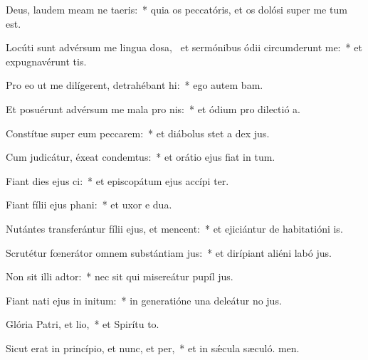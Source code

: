 \item Deus, laudem meam ne taeris:~* quia os peccatóris, et os dolósi super me tum est.
\item Locúti sunt advérsum me lingua dosa,~\pscross{} et sermónibus ódii circumderunt me:~* et expugnavérunt  tis.
\item Pro eo ut me dilígerent, detrahébant hi:~* ego autem bam.
\item Et posuérunt advérsum me mala pro nis:~* et ódium pro dilectió a.
\item Constítue super eum peccarem:~* et diábolus stet a dex jus.
\item Cum judicátur, éxeat condemtus:~* et orátio ejus fiat in tum.
\item Fiant dies ejus ci:~* et episcopátum ejus accípi ter.
\item Fiant fílii ejus phani:~* et uxor e dua.
\item Nutántes transferántur fílii ejus, et mencent:~* et ejiciántur de habitatióni is.
\item Scrutétur fœnerátor omnem substántiam jus:~* et dirípiant aliéni labó jus.
\item Non sit illi adtor:~* nec sit qui misereátur pupíl jus.
\item Fiant nati ejus in initum:~* in generatióne una deleátur no jus.
\item Glória Patri, et lio,~* et Spirítu to.
\item Sicut erat in princípio, et nunc, et per,~* et in sǽcula sæculó. men.
